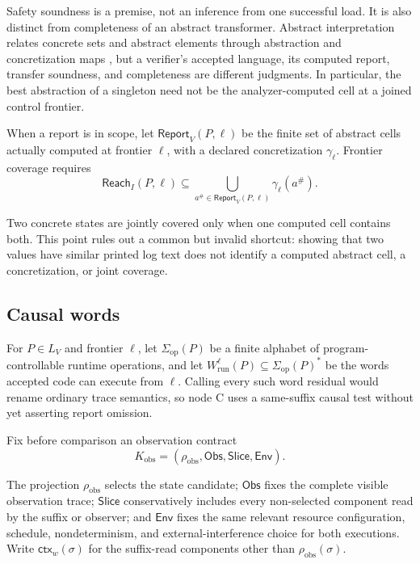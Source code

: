 \documentclass[conference]{IEEEtran}
\begin{document}
Safety soundness is a premise, not an inference from one successful load. It is also distinct from completeness of an abstract transformer. Abstract interpretation relates concrete sets and abstract elements through abstraction and concretization maps \cite{ref5}, but a verifier's accepted language, its computed report, transfer soundness, and completeness are different judgments. In particular, the best abstraction of a singleton need not be the analyzer-computed cell at a joined control frontier.

When a report is in scope, let $\mathsf{Report}_V(P,\ell)$ be the finite set of abstract cells actually computed at frontier $\ell$, with a declared concretization $\gamma_\ell$. Frontier coverage requires
\begin{equation}
\mathsf{Reach}_I(P,\ell)
\subseteq
\bigcup_{a^\#\in\mathsf{Report}_V(P,\ell)}\gamma_\ell(a^\#).
\end{equation}

Two concrete states are jointly covered only when one computed cell contains both. This point rules out a common but invalid shortcut: showing that two values have similar printed log text does not identify a computed abstract cell, a concretization, or joint coverage.

\subsection{Causal words}

For $P\in L_V$ and frontier $\ell$, let $\Sigma_{\mathrm{op}}(P)$ be a finite alphabet of program-controllable runtime operations, and let $W^\ell_{\mathrm{run}}(P)\subseteq\Sigma_{\mathrm{op}}(P)^*$ be the words accepted code can execute from $\ell$. Calling every such word residual would rename ordinary trace semantics, so node C uses a same-suffix causal test without yet asserting report omission.

Fix before comparison an observation contract
\begin{equation}
K_{\mathrm{obs}}=(\rho_{\mathrm{obs}},\mathsf{Obs},\mathsf{Slice},\mathsf{Env}).
\end{equation}

The projection $\rho_{\mathrm{obs}}$ selects the state candidate; $\mathsf{Obs}$ fixes the complete visible observation trace; $\mathsf{Slice}$ conservatively includes every non-selected component read by the suffix or observer; and $\mathsf{Env}$ fixes the same relevant resource configuration, schedule, nondeterminism, and external-interference choice for both executions. Write $\mathsf{ctx}_w(\sigma)$ for the suffix-read components other than $\rho_{\mathrm{obs}}(\sigma)$.
\end{document}
